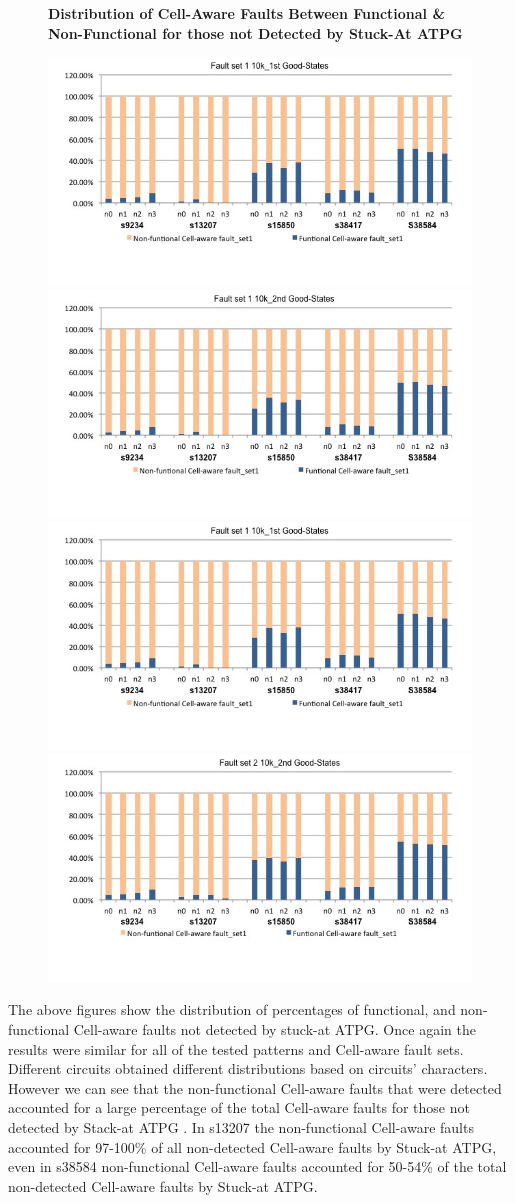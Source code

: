 \documentclass[12pt]{article}
\begin{document}
\begin{figure}[H]
\begin{center}
\textbf{Distribution of Cell-Aware Faults Between Functional & Non-Functional for those not Detected by Stuck-At ATPG}\par\medskip
\end{center}
\begin{@twocolumntrue}
\includegraphics[scale=0.25,width=0.5\linewidth]{../distribution_set1_10k_1st.jpg}
\includegraphics[scale=0.25,width=0.5\linewidth]{../distribution_set1_10k_2nd.jpg}\\ 
\includegraphics[scale=0.25,width=0.5\linewidth]{../distribution_set1_10k_1st.jpg}
\includegraphics[scale=0.25,width=0.5\linewidth]{../distribution_set2_10k_2nd.jpg}
\end{@twocolumntrue}
\end{figure}

The above figures show the distribution of percentages of functional, and non-functional Cell-aware faults not detected by stuck-at ATPG. Once again the results were similar for all of the tested patterns and Cell-aware fault sets. Different circuits obtained different distributions based on circuits’ characters. However we can see that the non-functional Cell-aware faults that were detected accounted for a large percentage of the total Cell-aware faults for those not detected by Stack-at ATPG . In s13207 the non-functional Cell-aware faults accounted for 97-100\% of all non-detected Cell-aware faults by Stuck-at ATPG, even in s38584 non-functional Cell-aware faults accounted for 50-54\% of the total non-detected Cell-aware faults by Stuck-at ATPG. 
\end{document}
